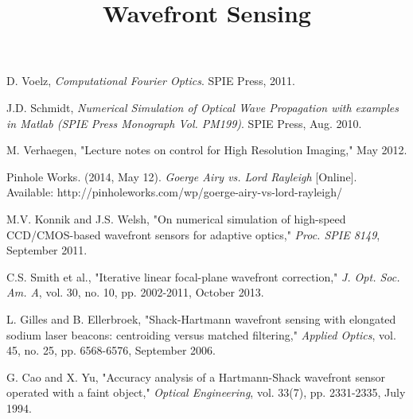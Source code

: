 \documentclass{article}
\title{Wavefront Sensing}
\begin{document}
\maketitle









\begin{thebibliography}{9}

D. Voelz, \textit{Computational Fourier Optics}. SPIE Press, 2011.

J.D. Schmidt, \textit{Numerical Simulation of Optical Wave Propagation with examples in Matlab (SPIE Press Monograph Vol. PM199)}. SPIE Press, Aug. 2010.

M. Verhaegen, "Lecture notes on control for High Resolution Imaging," May 2012.

Pinhole Works. (2014, May 12). \textit{Goerge Airy vs. Lord Rayleigh} [Online]. Available: http://pinholeworks.com/wp/goerge-airy-vs-lord-rayleigh/

M.V. Konnik and J.S. Welsh, "On numerical simulation of high-speed CCD/CMOS-based wavefront sensors for adaptive optics,"
\textit{Proc. SPIE 8149},
September 2011.

C.S. Smith et al., "Iterative linear focal-plane wavefront correction,"
\textit{J. Opt. Soc. Am. A}, vol. 30, no. 10, pp. 2002-2011, 
October 2013.

L. Gilles and B. Ellerbroek, "Shack-Hartmann wavefront sensing with elongated sodium laser beacons: centroiding versus matched filtering,"
\textit{Applied Optics}, vol. 45, no. 25, pp. 6568-6576, 
September 2006.

G. Cao and X. Yu, "Accuracy analysis of a Hartmann-Shack wavefront sensor operated with a faint object," 
\textit{Optical Engineering}, vol. 33(7), pp. 2331-2335, 
July 1994. 



\end{thebibliography}
\end{document}
